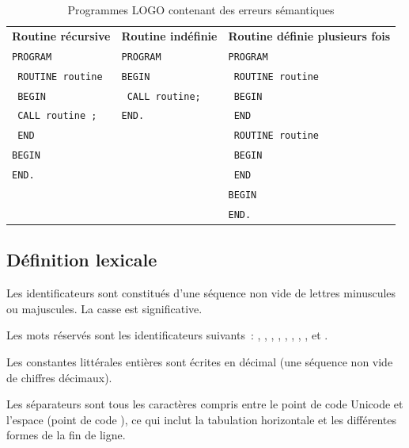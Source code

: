 \begin{table}[t]
  \centering
  \small
  \begin{tabular}{l|l|l}
  \textbf{Routine récursive}    &  \textbf{Routine indéfinie}    &  \textbf{Routine définie plusieurs fois} \\
  \texttt{PROGRAM}              &  \texttt{PROGRAM}              &  \texttt{PROGRAM}               \\
  \texttt{  ROUTINE routine}    &  \texttt{BEGIN}                &  \texttt{  ROUTINE routine}     \\
  \texttt{  BEGIN}              &  \texttt{  CALL routine;}      &  \texttt{  BEGIN}               \\
  \texttt{    CALL routine ;}   &  \texttt{END.}                 &  \texttt{  END}                 \\
  \texttt{  END}                &                                &  \texttt{  ROUTINE routine}     \\
  \texttt{BEGIN}                &                                &  \texttt{  BEGIN}               \\
  \texttt{END.}                 &                                &  \texttt{  END}                 \\
                                &                                &  \texttt{BEGIN}                 \\
                                &                                &  \texttt{END.}                  \\
  \end{tabular}
  \caption{Programmes LOGO contenant des erreurs sémantiques}
\end{table}


\subsection{Définition lexicale}

Les identificateurs sont constitués d'une séquence non vide de lettres minuscules ou majuscules. La casse est significative.

Les mots réservés sont les identificateurs suivants~: , , , , , , , ,  et .

Les constantes littérales entières sont écrites en décimal (une séquence non vide de chiffres décimaux).

Les séparateurs sont tous les caractères compris entre le point de code Unicode  et l’espace (point de code ), ce qui inclut la tabulation horizontale et les différentes formes de la fin de ligne.

